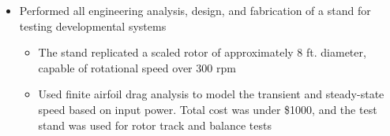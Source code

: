 \documentclass[10pt,a4paper]{article}
\begin{document}
\begin{itemize}
  \item Performed all engineering analysis, design, and fabrication of a stand for testing
    developmental systems

  \begin{itemize}
    \item The stand replicated a scaled rotor of approximately 8 ft. diameter, capable of
      rotational speed over 300 rpm

    \item Used finite airfoil drag analysis to model the transient and steady-state speed based
      on input power. Total cost was under \$1000, and the test stand was used for rotor track
      and balance tests
  \end{itemize}
\end{itemize}
\end{document}
